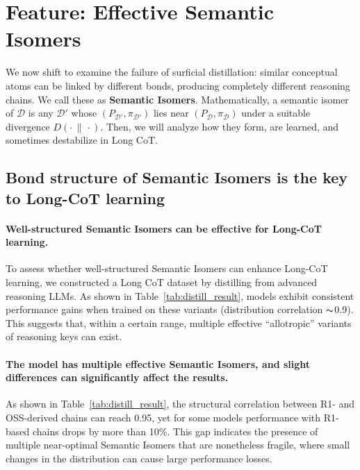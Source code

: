 \section{Feature: Effective Semantic Isomers}

We now shift to examine the failure of surficial distillation: similar conceptual atoms can be linked by different bonds, producing completely different reasoning chains. We call these as \textbf{Semantic Isomers}. Mathematically, a semantic isomer of \(\mathcal{D}\) is any \(\mathcal{D}'\) whose \((P_{\mathcal{D}'}, \pi_{\mathcal{D}'})\) lies near \((P_{\mathcal{D}}, \pi_{\mathcal{D}})\) under a suitable divergence \(D(\cdot \,\|\, \cdot)\). Then, we will analyze how they form, are learned, and sometimes destabilize in Long CoT.


\subsection{Bond structure of Semantic Isomers is the key to Long-CoT learning}

\paragraph{\textbf{Well-structured Semantic Isomers can be effective for Long-CoT learning.}}
To assess whether well-structured Semantic Isomers can enhance Long-CoT learning, we constructed a Long CoT dataset by distilling from advanced reasoning LLMs. As shown in Table~\ref{tab:distill_result}, models exhibit consistent performance gains when trained on these variants (distribution correlation $\thicksim$0.9). This suggests that, within a certain range, multiple effective “allotropic”
variants of reasoning keys can exist.\vspace{-8pt}



\paragraph{\textbf{The model has multiple effective Semantic Isomers, and slight differences can significantly affect the results.}}
As shown in Table~\ref{tab:distill_result}, the structural correlation between R1- and OSS-derived chains can reach 0.95, yet for some models performance with R1-based chains drops by more than 10\%.
This gap indicates the presence of multiple near-optimal Semantic Isomers that are nonetheless fragile, where small changes in the distribution can cause large performance losses.\vspace{-8pt}

